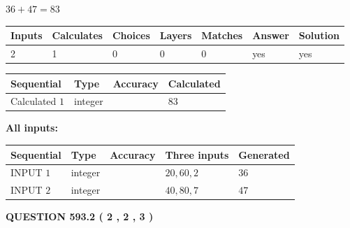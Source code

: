 \documentclass[12pt]{article}
\begin{document}
 

$ %
36 +  %
47=   %
83$
 
 
\noindent{}
 
 

 
   
   
   
   
\noindent\begin{tabular}{|l|l|l|l|l|l|l|}
 \hline
Inputs & Calculates & Choices & Layers & Matches & Answer & Solution \\ \hline
 2  & 
 1  & 
 0
  & 
 0  & 
 0  & 
  yes & 
  yes 
  \\ \hline
 \end{tabular}
   
   
   
   
\noindent{}
   
   
  
  
\noindent\begin{tabular}{|l|l|l|l|}
\hline
 Sequential & Type & Accuracy & Calculated \\ 
\hline
 
 
  Calculated $  1 $ & integer &  & 
  $ 83 $ 
 \\  \hline  
 \end{tabular}
   
   
   
   
\noindent\vspace{0.1in}\hspace{-0.08in} {\textbf{\Large{All inputs: }}}
   
   
  
  
\noindent\begin{tabular}{|l|l|l|l|l|}
\hline
 Sequential & Type & Accuracy & Three inputs & Generated \\ 
\hline
 
 
  INPUT $  1 $ & integer &  & $
 20
 , 
 60
 , 
 2
 $ & $ 36 $ 
 \\  \hline  
 
 
  INPUT $  2 $ & integer &  & $
 40
 , 
 80
 , 
 7
 $ & $ 47 $ 
 \\  \hline  
 \end{tabular}
   
   
  
\vspace{0.2in}
  
{\textbf{\Large{QUESTION
593.2 
 ( 2 , 2 , 3 )
}}}
  
\end{document}
